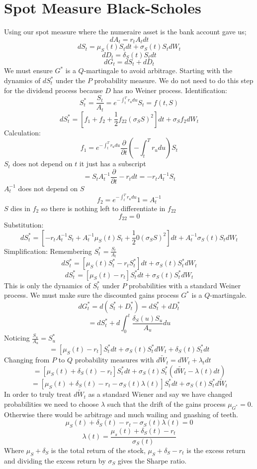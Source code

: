 
\section{Spot Measure Black-Scholes}

Using our spot measure where the numeraire asset is the bank account gave us;
\[dA_t=r_tA_tdt\]
\[dS_t=\mu_S(t)S_tdt+\sigma_S(t)S_tdW_t\]
\[dD_t=\delta_S(t)S_tdt\]
\[dG_t=dS_t+dD_t\]
We must ensure $G^*$ is a $Q$-martingale to avoid arbitrage. Starting with the
dynamics of $dS_t^*$ under the $P$ probability measure. We do not need to do
this step for the dividend process because $D$ has no Weiner process.
Identification:
\[S_t^*=\frac{S_t}{A_t}=e^{-\int_t^Tr_udu}S_t=f(t,S)\]
\[
  dS_t^*=\left[ f_1+f_2+\frac{1}{2}f_{22}(\sigma_SS)^2\right] dt+\sigma_Sf_2dW_t
\]
Calculation:
\[
  f_1=e^{-\int_t^Tr_udu}\frac{\partial}{\partial t}
  \left( -\int_t^Tr_udu\right) S_t
\]
$S_t$ does not depend on $t$ it just has a subscript
\[=S_tA_t^{-1}\frac{\partial}{\partial t}-r_tdt=-r_tA_t^{-1}S_t\]
$A_t^{-1}$ does not depend on $S$
\[f_2=e^{-\int_t^Tr_udu}1=A_t^{-1}\]
$S$ dies in $f_2$ so there is nothing left to differentiate in $f_{22}$
\[f_{22}=0\]
Substitution:
\[
  dS_t^*=\left[ -r_tA_t^{-1}S_t+A_t^{-1}\mu_S(t)S_t+\frac{1}{2}0(\sigma_SS)^2
  \right] dt+A_t^{-1}\sigma_S(t)S_tdW_t
\]
Simplification: Remembering $S_t^*=\frac{S_t}{A_t}$
\[dS_t^*=\left[ \mu_S(t)S_t^*-r_tS_t^*\right] dt+\sigma_S(t)S_t^*dW_t\]
\[dS_t^*=\left[ \mu_S(t)-r_t\right] S_t^*dt+\sigma_S(t)S_t^*dW_t\]
This is only the dynamics of $S_t^*$ under $P$ probabilities with a standard
Weiner process.
We must make sure the discounted gains process $G^*$ is a $Q$-martingale.
\[dG_t^*=d(S_t^*+D_t^*)=dS_t^*+dD_t^*\]
\[=dS_t^*+d\int_0^t\frac{\delta_S(u)S_u}{A_u}du\]
Noticing $\frac{S_u}{A_u}=S_u^*$
\[=[\mu_S(t)-r_t]S_t^*dt+\sigma_S(t)S_t^*dW_t+\delta_S(t)S_t^*dt\]
Changing from $P$ to $Q$ probability measures with
$d\tilde{W}_t=dW_t+\lambda_tdt$
\[
  =[\mu_S(t)+\delta_S(t)-r_t]S_t^*dt+
  \sigma_S(t)S_t^*(d\tilde{W}_t-\lambda(t)dt)
\]
\[
  =[\mu_S(t)+\delta_S(t)-r_t-\sigma_S(t)\lambda(t)]S_t^*dt+
  \sigma_S(t)S_t^*d\tilde{W}_t
\]
In order to truly treat $d\tilde{W}_t$ as a standard Wiener and say we have
changed probabilities we need to choose $\lambda$ such that the drift of the
gains process $\mu_{G^*}=0$. Otherwise there would be arbitrage and much
wailing and gnashing of teeth.
\[\mu_S(t)+\delta_S(t)-r_t-\sigma_S(t)\lambda(t)=0\]
\[\lambda(t)=\frac{\mu_s(t)+\delta_S(t)-r_t}{\sigma_S(t)}\]
Where $\mu_S+\delta_S$ is the total return of the stock,
$\mu_S+\delta_S-r_t$ is the excess return and dividing the excess return by
$\sigma_S$ gives the Sharpe ratio.

